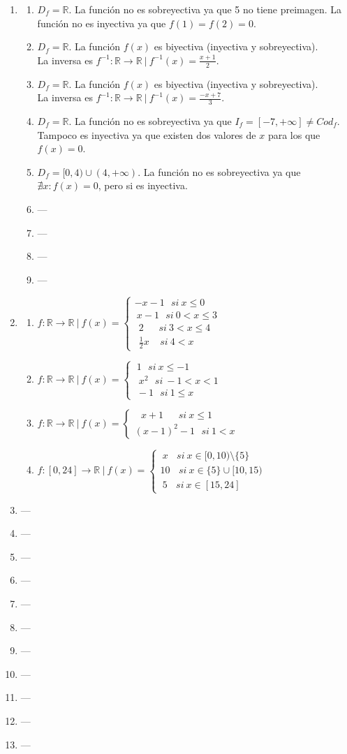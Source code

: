 \documentclass[a4paper]{article}
\newcommand{\exercise}{\item}
\begin{document}
\begin{enumerate}
\begin{enumerate} [label=(\alph*)]
\end{enumerate}\exercise\begin{enumerate} [label=(\alph*)]		\item $D_f=\mathbb{R}$. La función no es sobreyectiva ya que 5 no tiene preimagen. La función no es inyectiva ya que $f(1)=f(2)=0$. 
		\item $D_f=\mathbb{R}$. La función $f(x)$ es biyectiva (inyectiva y sobreyectiva). \\ La inversa es $f^{-1}:\mathbb{R} \to \mathbb{R} ~|~ f^{-1}(x)=\displaystyle{\frac{x+1}{2}}$. 
		\item $D_f=\mathbb{R}$. La función $f(x)$ es biyectiva (inyectiva y sobreyectiva). \\ La inversa es $f^{-1}:\mathbb{R} \to \mathbb{R} ~|~ f^{-1}(x)=\displaystyle{\frac{-x+7}{3}}$. 
		\item $D_f=\mathbb{R}$. La función no es sobreyectiva ya que $I_f=[-7,+\infty]\neq Cod_f$. Tampoco es inyectiva ya que existen dos valores de $x$ para los que $f(x)=0$.
		\item $D_f=[0,4) \cup (4,+\infty)$. La función no es sobreyectiva ya que $\nexists x: f(x)=0$, pero si es inyectiva. 
\item ---\item ---\item ---\item ---\end{enumerate}\exercise\begin{enumerate} [label=(\alph*)]		\item $f: \mathbb{R} \to \mathbb{R} ~|~ f(x)=\left\{\begin{matrix}-x-1 ~~~si~ x\leq0~~~~~\\~x-1 ~~~si~ 0<x\leq 3 \\ ~~2~~ ~~~~~si~ 3<x\leq4 \\ ~~\frac{1}{2}x~~ ~~~si~ 4<x~~~~~ \end{matrix}\right.$
		\item $f: \mathbb{R} \to \mathbb{R} ~|~ f(x)=\left\{\begin{matrix}~1 ~~~si~ x\leq-1~~~~~\\~~x^2 ~~~si~ -1<x< 1 \\ ~-1 ~~~si~ 1\leq x ~~~~~~~\end{matrix}\right.$
		\item $f: \mathbb{R} \to \mathbb{R} ~|~ f(x)=\left\{\begin{matrix}~~~x+1 ~~~~~~~si~ x\leq1 \\(x-1)^2-1 ~~~si~ 1<x \end{matrix}\right.$
		\item $f: [0,24] \to \mathbb{R} ~|~ f(x)=\left\{\begin{matrix}~x ~~~~ si~ x\in [0,10)\setminus\{5\}~~ \\10 ~~~~ si~ x\in\{5\}\cup[10,15) \\~5 ~~~~ si~ x\in[15,24]~~~~~~\end{matrix}\right.$
\end{enumerate}\exercise---\exercise---\exercise---\exercise---\exercise---\exercise---\exercise---\exercise---\exercise---\exercise---\exercise---\end{enumerate}
\end{document}
